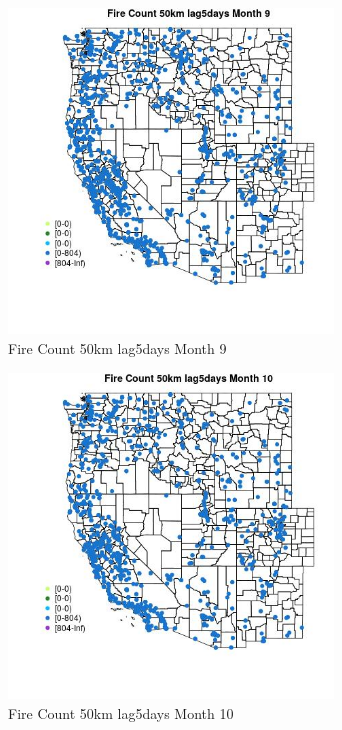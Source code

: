 \begin{figure} 
\centering  
\includegraphics[width=0.77\textwidth]{Code_Outputs/Report_ML_input_PM25_Step4_part_f_de_duplicated_aves_prioritize_24hr_obswNAs_MapObsMo9Fire_Count_50km_lag5days.jpg} 
\caption{\label{fig:Report_ML_input_PM25_Step4_part_f_de_duplicated_aves_prioritize_24hr_obswNAsMapObsMo9Fire_Count_50km_lag5days}Fire Count 50km lag5days Month 9} 
\end{figure} 
 

\begin{figure} 
\centering  
\includegraphics[width=0.77\textwidth]{Code_Outputs/Report_ML_input_PM25_Step4_part_f_de_duplicated_aves_prioritize_24hr_obswNAs_MapObsMo10Fire_Count_50km_lag5days.jpg} 
\caption{\label{fig:Report_ML_input_PM25_Step4_part_f_de_duplicated_aves_prioritize_24hr_obswNAsMapObsMo10Fire_Count_50km_lag5days}Fire Count 50km lag5days Month 10} 
\end{figure} 
 

